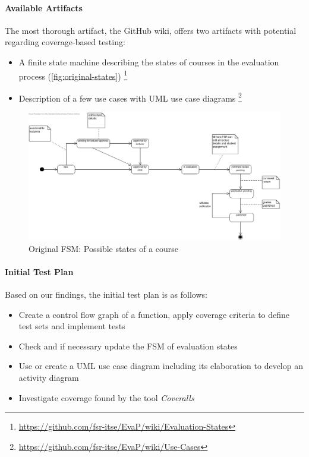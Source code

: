 \paragraph{Available Artifacts}
The most thorough artifact, the GitHub wiki, offers two artifacts with potential regarding coverage-based testing:
\begin{itemize}
    \item A finite state machine describing the states of courses in the evaluation process (\autoref{fig:original-states})%
    \footnote{\url{https://github.com/fsr-itse/EvaP/wiki/Evaluation-States}}
    \item Description of a few use cases with UML use case diagrams%
    \footnote{\url{https://github.com/fsr-itse/EvaP/wiki/Use-Cases}}
\end{itemize}
\begin{figure}[h]
    \centering
    \includegraphics[width=\textwidth, keepaspectratio]{graphics/original_states_of_a_course}
    \caption{Original FSM: Possible states of a course}
    \label{fig:original-states}
\end{figure}

\paragraph{Initial Test Plan}
Based on our findings, the initial test plan is as follows:
\begin{itemize}
    \item Create a control flow graph of a function, apply coverage criteria to define test sets and implement tests
    \item Check and if necessary update the FSM of evaluation states
    \item Use or create a UML use case diagram including its elaboration to develop an activity diagram
    \item Investigate coverage found by the tool \textit{Coveralls}
\end{itemize}
